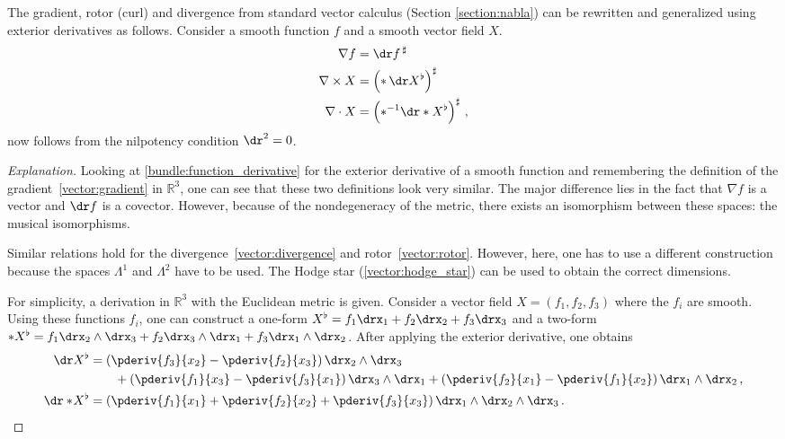     \begin{remark}\label{bundle:vector_calculus}
        The gradient, rotor (curl) and divergence from standard vector calculus (Section \ref{section:nabla}) can be rewritten and generalized using exterior derivatives as follows. Consider a smooth function $f$ and a smooth vector field $X$.
        \begin{gather}
            \begin{aligned}
                \nabla f &= \dr f\,^\sharp\\
                \nabla\times X &= \left(\ast\,\dr X^\flat\right)^\sharp\\
                \nabla\cdot X &= \left(\ast^{-1}\dr\ast X^\flat\right)^\sharp\,,
            \end{aligned}
        \end{gather}
         now follows from the nilpotency condition $\dr^2=0$.
        \begin{mdframed}[roundcorner=10pt, linecolor=blue, linewidth=1pt]
            \begin{proof}[Explanation]
                Looking at \cref{bundle:function_derivative} for the exterior derivative of a smooth function and remembering the definition of the gradient~\ref{vector:gradient} in $\mathbb{R}^3$, one can see that these two definitions look very similar. The major difference lies in the fact that $\nabla f$ is a vector and $\dr f$ is a covector. However, because of the nondegeneracy of the metric, there exists an isomorphism between these spaces: the musical isomorphisms.

                Similar relations hold for the divergence~\ref{vector:divergence} and rotor~\ref{vector:rotor}. However, here, one has to use a different construction because the spaces $\Lambda^1$ and $\Lambda^2$ have to be used. The Hodge star (\cref{vector:hodge_star}) can be used to obtain the correct dimensions.

                For simplicity, a derivation in $\mathbb{R}^3$ with the Euclidean metric is given. Consider a vector field $X = (f_1,f_2,f_3)$ where the $f_i$ are smooth. Using these functions $f_i$, one can construct a one-form $X^\flat = f_1\drx_1 + f_2\drx_2 + f_3\drx_3$ and a two-form $\ast X^\flat = f_1\drx_2\wedge\drx_3 + f_2\drx_3\wedge\drx_1 + f_3\drx_1\wedge\drx_2$. After applying the exterior derivative, one obtains
                \begin{align*}
                    \dr X^\flat &= \left(\pderiv{f_3}{x_2} - \pderiv{f_2}{x_3}\right)\drx_2\wedge\drx_3\\
                    &\qquad + \left(\pderiv{f_1}{x_3} - \pderiv{f_3}{x_1}\right)\drx_3\wedge\drx_1 + \left(\pderiv{f_2}{x_1} - \pderiv{f_1}{x_2}\right)\drx_1\wedge\drx_2\,,\\
                    \dr\ast\!X^\flat &= \left(\pderiv{f_1}{x_1} + \pderiv{f_2}{x_2} + \pderiv{f_3}{x_3}\right)\drx_1\wedge\drx_2\wedge\drx_3\,.
                \end{align*}$ $
            \end{proof}
        \end{mdframed}
    \end{remark}

